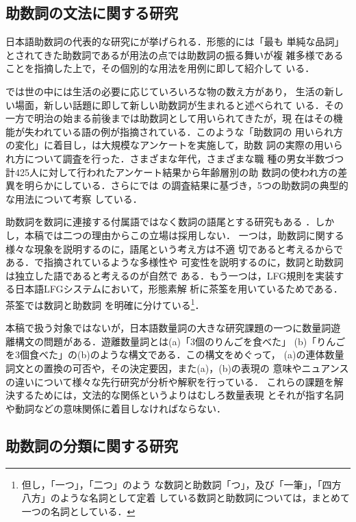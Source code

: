 \documentclass[japanese]{jnlp_1.4}
\begin{document}
\subsection{助数詞の文法に関する研究}

日本語助数詞の代表的な研究に\cite{kenbo}が挙げられる．形態的には「最も
単純な品詞」とされてきた助数詞であるが用法の点では助数詞の振る舞いが複
雑多様であることを指摘した上で，その個別的な用法を用例に即して紹介して
いる．

\cite{kenbo}では世の中には生活の必要に応じていろいろな物の数え方があり，
生活の新しい場面，新しい話題に即して新しい助数詞が生まれると述べられて
いる．その一方で明治の始まる前後までは助数詞として用いられてきたが，現
在はその機能が失われている語の例が指摘されている．このような「助数詞の
用いられ方の変化」に着目し，\cite{ogino}は大規模なアンケートを実施して，助数
詞の実際の用いられ方について調査を行った．さまざまな年代，さまざまな職
種の男女半数づつ計425人に対して行われたアンケート結果から年齢層別の助
数詞の使われ方の差異を明らかにしている．さらに\cite{tanihara}では
\cite{ogino}の調査結果に基づき，5つの助数詞の典型的な用法について考察
している．

助数詞を数詞に連接する付属語ではなく数詞の語尾とする研究もある
\cite{morishige}．しかし，本稿では二つの理由からこの立場は採用しない．
一つは，助数詞に関する様々な現象を説明するのに，語尾という考え方は不適
切であると考えるからである．\cite{kenbo}で指摘されているような多様性や
可変性を説明するのに，数詞と助数詞は独立した語であると考えるのが自然で
ある．もう一つは，LFG規則を実装する日本語LFGシステムにおいて，形態素解
析に茶筌\cite{chaurl}を用いているためである．茶筌では数詞と助数詞
を明確に分けている\footnote{但し，「一つ」，「二つ」のよう
な数詞と助数詞「つ」，及び「一筆」，「四方八方」のような名詞として定着
している数詞と助数詞については，まとめて一つの名詞としている．}．

本稿で扱う対象ではないが，日本語数量詞の大きな研究課題の一つに数量詞遊
離構文の問題がある\cite{okabe}．遊離数量詞とは(a)「3個のりんごを食べた」
(b)「りんごを3個食べた」の(b)のような構文である．この構文をめぐって，
(a)の連体数量詞文との置換の可否や，その決定要因，また(a)，(b)の表現の
意味やニュアンスの違いについて様々な先行研究が分析や解釈を行っている．
これらの課題を解決するためには，文法的な関係というよりはむしろ数量表現
とそれが指す名詞や動詞などの意味関係に着目しなければならない．

\subsection{助数詞の分類に関する研究}
\end{document}

